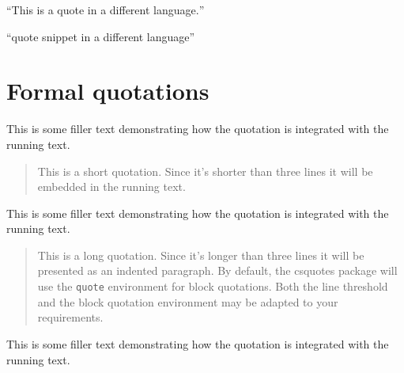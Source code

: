 \documentclass[a4paper]{article}
\newcommand*{\example}[1]{%
  \addvspace{\baselineskip}%
  \par\noindent\hspace{-4em}%
  \makebox[3em][r]{\textbf{Ex. #1}}%
  \hspace{1em}\ignorespaces}
\begin{document}
\example{4} \foreignquote{american}{This is a quote in a different language.}


\example{5} \hyphenquote{american}{quote snippet in a different language}

%
%
% 
%
%
%
%
% 
%
% 

\EnableQuotes %


\section{Formal quotations}


\example{1}
This is some filler text demonstrating how the quotation is integrated with
the running text. \blockquote{This is a short quotation. Since it's shorter
than three lines it will be embedded in the running text.} This is some filler
text demonstrating how the quotation is integrated with the running text.
\blockquote{This is a long quotation. Since it's longer than three lines it
will be presented as an indented paragraph. By default, the csquotes package
will use the \texttt{quote} environment for block quotations. Both the line
threshold and the block quotation environment may be adapted to your
requirements.} This is some filler text demonstrating how the quotation is
integrated with the running text.
\end{document}

